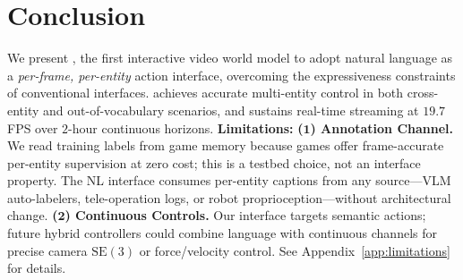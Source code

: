 \section{Conclusion}
\label{sec:conclusion}
We present \methodname, the first interactive video world model to adopt natural language
as a \emph{per-frame, per-entity} action interface, overcoming the
expressiveness constraints of conventional interfaces. 
\methodname achieves
accurate multi-entity control in both cross-entity and out-of-vocabulary scenarios, and
sustains real-time streaming at $19.7$\,FPS over $2$-hour continuous horizons.
\textbf{Limitations: }
\textbf{($\mathbf{1}$) Annotation Channel.}
We read training labels from game memory because games offer
frame-accurate per-entity supervision at zero cost; this is a testbed
choice, not an interface property. The NL interface consumes per-entity
captions from any source---VLM auto-labelers, tele-operation logs, or
robot proprioception---without architectural change.
\textbf{($\mathbf{2}$) Continuous Controls.}
Our interface targets semantic actions; future hybrid controllers could combine language with continuous channels for precise camera $\mathrm{SE}(3)$ or force/velocity control. See Appendix~\ref{app:limitations} for details.
